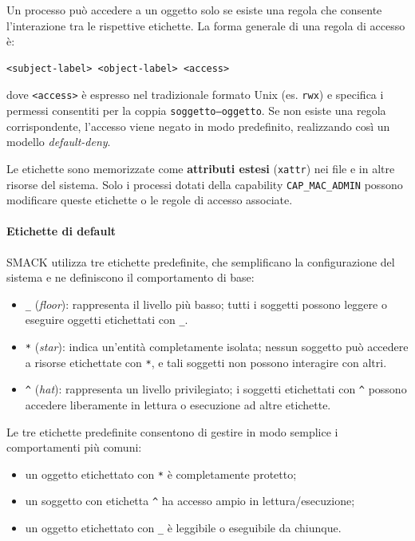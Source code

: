 Un processo può accedere a un oggetto solo se esiste una regola che consente l’interazione tra le rispettive etichette.
La forma generale di una regola di accesso è:
\begin{verbatim}
<subject-label> <object-label> <access>
\end{verbatim}
dove \texttt{<access>} è espresso nel tradizionale formato Unix (es. \texttt{rwx}) e specifica i permessi consentiti per la coppia \texttt{soggetto–oggetto}.
Se non esiste una regola corrispondente, l’accesso viene negato in modo predefinito, realizzando così un modello \textit{default-deny}.

Le etichette sono memorizzate come \textbf{attributi estesi} (\texttt{xattr}) nei file e in altre risorse del sistema.
Solo i processi dotati della capability \texttt{CAP\_MAC\_ADMIN} possono modificare queste etichette o le regole di accesso associate.

\paragraph{Etichette di default}
SMACK utilizza tre etichette predefinite, che semplificano la configurazione del sistema e ne definiscono il comportamento di base:
\begin{itemize}
  \item \texttt{\_} (\textit{floor}): rappresenta il livello più basso; tutti i soggetti possono leggere o eseguire oggetti etichettati con \texttt{\_}.
  \item \texttt{*} (\textit{star}): indica un’entità completamente isolata; nessun soggetto può accedere a risorse etichettate con \texttt{*}, e tali soggetti non possono interagire con altri.
  \item \texttt{\^} (\textit{hat}): rappresenta un livello privilegiato; i soggetti etichettati con \texttt{\^} possono accedere liberamente in lettura o esecuzione ad altre etichette.
\end{itemize}

Le tre etichette predefinite consentono di gestire in modo semplice i comportamenti più comuni:
\begin{itemize}
  \item un oggetto etichettato con \texttt{*} è completamente protetto;
  \item un soggetto con etichetta \texttt{\^} ha accesso ampio in lettura/esecuzione;
  \item un oggetto etichettato con \texttt{\_} è leggibile o eseguibile da chiunque.
\end{itemize}

